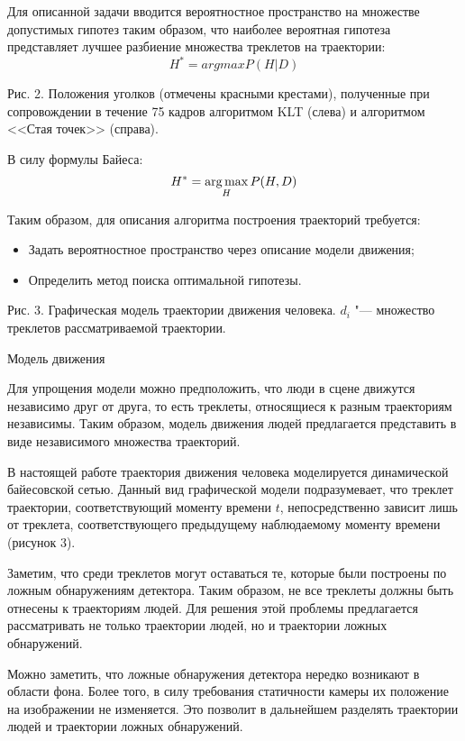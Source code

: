 Для описанной задачи вводится вероятностное пространство на множестве допустимых гипотез таким образом, что наиболее вероятная гипотеза представляет лучшее разбиение множества треклетов на траектории:
\begin{equation}
	H^* = argmax P(H|D)
\end{equation}

Рис. 2. Положения уголков (отмечены красными крестами), полученные при сопровождении в течение 75 кадров алгоритмом KLT (слева) и алгоритмом <<Стая точек>> (справа).

В силу формулы Байеса:
\begin{equation}
	H^*= \operatorname*{arg\,max}_H P(H, D)
\end{equation}

Таким образом, для описания алгоритма построения траекторий требуется:
\begin{itemize}
	\item Задать вероятностное пространство через описание модели движения;
	\item Определить метод поиска оптимальной гипотезы.
\end{itemize}

Рис. 3. Графическая модель траектории движения человека. ${d_i}$ "--- множество треклетов рассматриваемой траектории.

Модель движения

Для упрощения модели можно предположить, что люди в сцене движутся независимо друг от друга, то есть треклеты, относящиеся к разным траекториям независимы. Таким образом, модель движения людей предлагается представить в виде независимого множества траекторий.

В настоящей работе траектория движения человека моделируется динамической байесовской сетью. Данный вид графической модели подразумевает, что треклет траектории, соответствующий моменту времени $t$, непосредственно зависит лишь от треклета, соответствующего предыдущему наблюдаемому моменту времени (рисунок 3).

Заметим, что среди треклетов могут оставаться те, которые были построены по ложным обнаружениям детектора. Таким образом, не все треклеты должны быть отнесены к траекториям людей. Для решения этой проблемы предлагается рассматривать не только траектории людей, но и траектории ложных обнаружений.

Можно заметить, что ложные обнаружения детектора нередко возникают в области фона. Более того, в силу требования статичности камеры их положение на изображении не изменяется. Это позволит в дальнейшем разделять траектории людей и траектории ложных обнаружений. 

